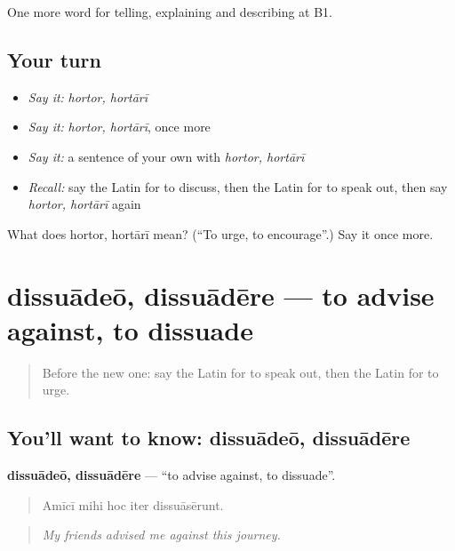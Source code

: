 \begin{grammarlens}[title={What you've built}]
One more word for telling, explaining and describing at B1.
\end{grammarlens}

\subsection*{Your turn}
\begin{itemize}
\raggedright
  \item \emph{Say it:} \emph{hortor, hortārī}
  \item \emph{Say it:} \emph{hortor, hortārī}, once more
  \item \emph{Say it:} a sentence of your own with \emph{hortor, hortārī}
  \item \emph{Recall:} say the Latin for to discuss, then the Latin for to speak out, then say \emph{hortor, hortārī} again
\end{itemize}

\begin{tcolorbox}[breakable,colback=teal!4,colframe=teal!35!black,title={Before you move on}]
What does hortor, hortārī mean? (\textquotedblleft{}To urge, to encourage\textquotedblright{}.) Say it once more.
\end{tcolorbox}
\section[dissuādeō, dissuādēre]{dissuādeō, dissuādēre — to advise against, to dissuade}

\label{lesson:LA-C369-dissuadeo}



\begin{quote}
Before the new one: say the Latin for to speak out, then the Latin for to urge.
\end{quote}

\subsection*{You'll want to know: dissuādeō, dissuādēre}
\textbf{dissuādeō, dissuādēre} — \textquotedblleft{}to advise against, to dissuade\textquotedblright{}.

\begin{quote}
Amīcī mihi hoc iter dissuāsērunt.
\end{quote}

\begin{quote}
\emph{My friends advised me against this journey.}
\end{quote}

